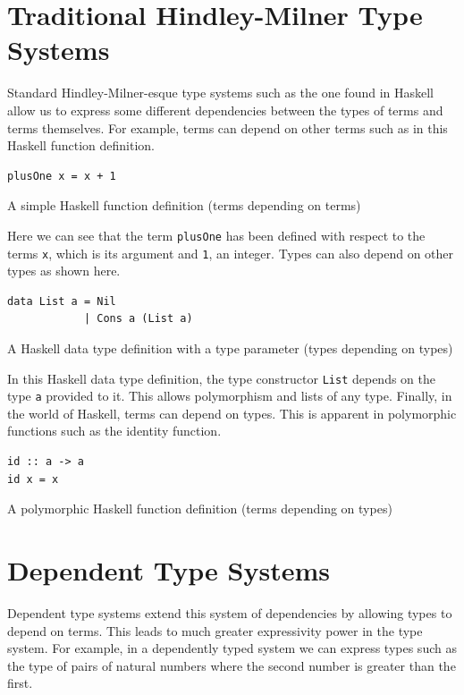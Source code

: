 \documentclass[a4paper, notitlepage]{report}
\begin{document}
\section{Traditional Hindley-Milner Type Systems}
\label{sec:org8ceba7c}
Standard Hindley-Milner-esque type systems such as the one found in Haskell
allow us to express some different dependencies between the types of terms and
terms themselves. For example, terms can depend on other terms such as in this
Haskell function definition.

\begin{listing}[H]
\begin{verbatim}
plusOne x = x + 1
\end{verbatim}
\caption{A simple Haskell function definition (terms depending on terms)}
\end{listing}

Here we can see that the term \texttt{plusOne} has been defined with respect to the
terms \texttt{x}, which is its argument and \texttt{1}, an integer. Types can also depend on
other types as shown here.

\begin{listing}[H]
\begin{verbatim}
data List a = Nil
            | Cons a (List a)
\end{verbatim}
\caption{A Haskell data type definition with a type parameter (types depending on types)}
\end{listing}

In this Haskell data type definition, the type constructor \texttt{List} depends on the
type \texttt{a} provided to it. This allows polymorphism and lists of any type.
Finally, in the world of Haskell, terms can depend on types. This is apparent in
polymorphic functions such as the identity function.

\begin{listing}[H]
\begin{verbatim}
id :: a -> a
id x = x
\end{verbatim}
\caption{A polymorphic Haskell function definition (terms depending on types)}
\end{listing}

\section{Dependent Type Systems}
\label{sec:orga25bfd2}
Dependent type systems extend this system of dependencies by allowing types to
depend on terms. This leads to much greater expressivity power in the type
system. For example, in a dependently typed system we can express types such as
the type of pairs of natural numbers where the second number is greater than the
first.
\end{document}
